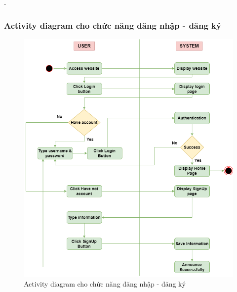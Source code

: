 \begin {list} {-}{}
\subsubsection{Activity diagram cho chức năng đăng nhập - đăng ký}
\begin{figure}[H]
    \centering
    \includegraphics[scale=0.6]{images/hieu/chap-3/login-signup-activity-diagram.png}
    \caption{Activity diagram cho chức năng đăng nhập - đăng ký}
\end{figure}
\newpage

\end{list}
